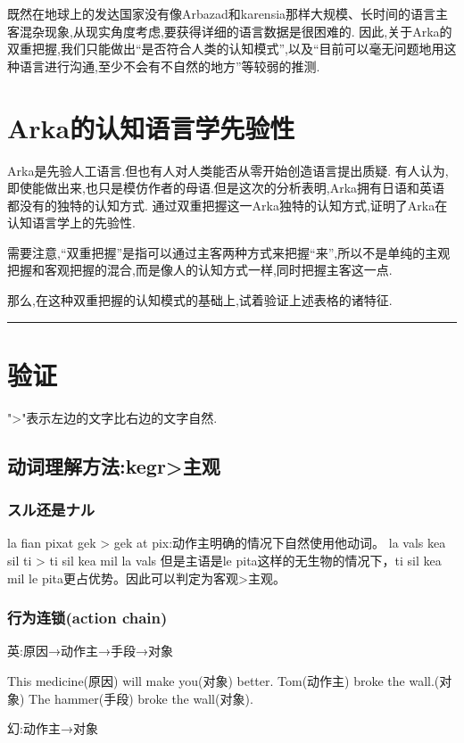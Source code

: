 既然在地球上的发达国家没有像Arbazad和karensia那样大规模、长时间的语言主客混杂现象,从现实角度考虑,要获得详细的语言数据是很困难的.
因此,关于Arka的双重把握,我们只能做出``是否符合人类的认知模式'',以及``目前可以毫无问题地用这种语言进行沟通,至少不会有不自然的地方''等较弱的推测.

\section{Arka的认知语言学先验性}
Arka是先验人工语言.但也有人对人类能否从零开始创造语言提出质疑.
有人认为,即使能做出来,也只是模仿作者的母语.但是这次的分析表明,Arka拥有日语和英语都没有的独特的认知方式.
通过双重把握这一Arka独特的认知方式,证明了Arka在认知语言学上的先验性.

需要注意,``双重把握''是指可以通过主客两种方式来把握``来'',所以不是单纯的主观把握和客观把握的混合,而是像人的认知方式一样,同时把握主客这一点.

那么,在这种双重把握的认知模式的基础上,试着验证上述表格的诸特征.

{\noindent} \rule[-10pt]{17.5cm}{0.05em}
\section{验证}

">"表示左边的文字比右边的文字自然.

\subsection{动词理解方法:kegr>主观}

\subsubsection{スル还是ナル}

la fian pixat gek > gek at pix:动作主明确的情况下自然使用他动词。
la vals kea sil ti > ti sil kea mil la vals
但是主语是le pita这样的无生物的情况下，ti sil kea mil le pita更占优势。因此可以判定为客观>主观。

\subsubsection{行为连锁(action chain)}

英:原因→动作主→手段→对象

This medicine(原因) will make you(对象) better.
Tom(动作主) broke the wall.(对象)
The hammer(手段) broke the wall(对象).

幻:动作主→对象

